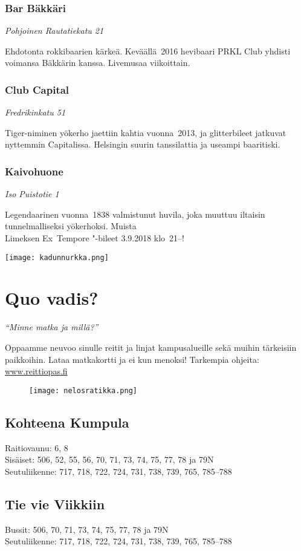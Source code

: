 \documentclass[../ala_hataile.tex]{subfiles}
\begin{document}
\subsubsection*{Bar Bäkkäri}
\textit{Pohjoinen Rautatiekatu 21}

Ehdotonta rokkibaarien kärkeä. Keväällä~2016 hevibaari PRKL Club yhdisti voimansa Bäkkärin kanssa. Livemusaa viikoittain.
\subsubsection*{Club Capital}
\textit{Fredrikinkatu 51}

Tiger-niminen yökerho jaettiin kahtia vuonna~2013, ja glitterbileet jatkuvat nyttemmin Capitalissa. Helsingin suurin tanssilattia ja useampi baaritiski.
\subsubsection*{Kaivohuone}
\textit{Iso Puistotie 1}

Legendaarinen vuonna~1838 valmistunut huvila, joka muuttuu iltaisin tunnelmalliseksi yökerhoksi. Muista \\Limeksen Ex~Tempore "-bileet 3.9.2018 klo~21--!
\begin{figure*}[!b]
	\centering
	\texttt{[image: kadunnurkka.png]}
\end{figure*}

\onecolumn
\section{Quo vadis?} {\small \itshape ``Minne matka ja millä?''}\vspace{0.5cm}

Oppaamme neuvoo sinulle reitit ja linjat kampusalueille sekä muihin tärkeisiin paikkoihin.
Lataa matkakortti ja ei kun menoksi! Tarkempia ohjeita: \url{www.reittiopas.fi}
\begin{figure}[!b]
	\centering
	\texttt{[image: nelosratikka.png]}
\end{figure}
\subsection*{Kohteena Kumpula}
Raitiovaunu: 6, 8 \\
Sisäiset: 506, 52, 55, 56, 70, 71, 73, 74, 75, 77, 78 ja 79N \\
Seutuliikenne: 717, 718, 722, 724, 731, 738, 739, 765, 785--788
\subsection*{Tie vie Viikkiin}
Bussit: 506, 70, 71, 73, 74, 75, 77, 78 ja 79N\\
Seutuliikenne: 717, 718, 722, 724, 731, 738, 739, 765, 785--788
\end{document}
